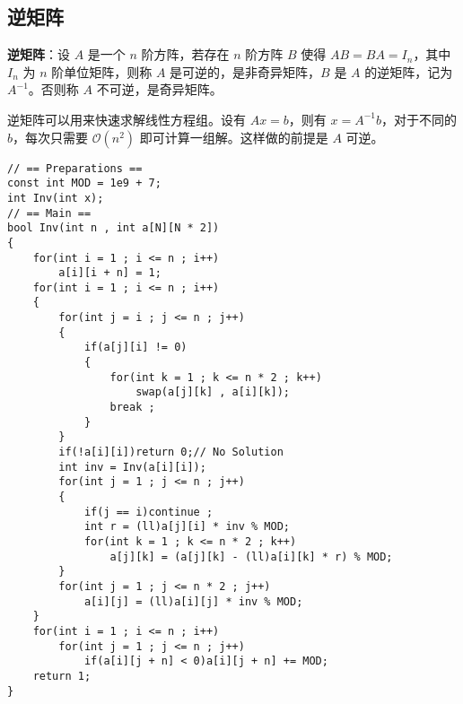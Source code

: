 \subsection{逆矩阵}

\begin{tcolorbox}
    \textbf{逆矩阵}：设 $A$ 是一个 $n$ 阶方阵，若存在 $n$ 阶方阵 $B$ 使得 $AB=BA=I_n$，其中 $I_n$ 为 $n$ 阶单位矩阵，则称 $A$ 是可逆的，是非奇异矩阵，$B$ 是 $A$ 的逆矩阵，记为 $A^{-1}$。否则称 $A$ 不可逆，是奇异矩阵。
\end{tcolorbox}

逆矩阵可以用来快速求解线性方程组。设有 $Ax=b$，则有 $x=A^{-1}b$，对于不同的 $b$，每次只需要 $\mathcal{O}(n^2)$ 即可计算一组解。这样做的前提是 $A$ 可逆。

\begin{verbatim}
// == Preparations ==
const int MOD = 1e9 + 7;
int Inv(int x);
// == Main ==
bool Inv(int n , int a[N][N * 2])
{
    for(int i = 1 ; i <= n ; i++)
        a[i][i + n] = 1;
    for(int i = 1 ; i <= n ; i++)
    {
        for(int j = i ; j <= n ; j++)
        {
            if(a[j][i] != 0)
            {
                for(int k = 1 ; k <= n * 2 ; k++)
                    swap(a[j][k] , a[i][k]);
                break ;
            }
        }
        if(!a[i][i])return 0;// No Solution
        int inv = Inv(a[i][i]);
        for(int j = 1 ; j <= n ; j++)
        {
            if(j == i)continue ;
            int r = (ll)a[j][i] * inv % MOD;
            for(int k = 1 ; k <= n * 2 ; k++)
                a[j][k] = (a[j][k] - (ll)a[i][k] * r) % MOD;
        }
        for(int j = 1 ; j <= n * 2 ; j++)
            a[i][j] = (ll)a[i][j] * inv % MOD;
    }
    for(int i = 1 ; i <= n ; i++)
        for(int j = 1 ; j <= n ; j++)
            if(a[i][j + n] < 0)a[i][j + n] += MOD;
    return 1;
}
\end{verbatim}
